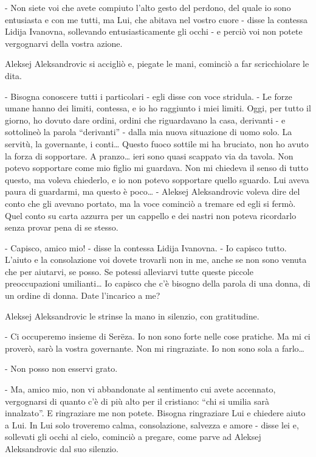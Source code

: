 - Non siete voi che avete compiuto l'alto gesto del perdono, del quale io sono entusiasta e con me tutti, ma Lui, che abitava nel vostro cuore - disse la contessa Lidija Ivanovna, sollevando entusiasticamente gli occhi - e perciò voi non potete vergognarvi della vostra azione. 

Aleksej Aleksandrovic si accigliò e, piegate le mani, cominciò a far scricchiolare le dita. 

- Bisogna conoscere tutti i particolari - egli disse con voce stridula. - Le forze umane hanno dei limiti, contessa, e io ho raggiunto i miei limiti. Oggi, per tutto il giorno, ho dovuto dare ordini, ordini che riguardavano la casa, derivanti - e sottolineò la parola ``derivanti'' - dalla mia nuova situazione di uomo solo. La servitù, la governante, i conti\ldots{} Questo fuoco sottile mi ha bruciato, non ho avuto la forza di sopportare. A pranzo\ldots{} ieri sono quasi scappato via da tavola. Non potevo sopportare come mio figlio mi guardava. Non mi chiedeva il senso di tutto questo, ma voleva chiederlo, e io non potevo sopportare quello sguardo. Lui aveva paura di guardarmi, ma questo è poco\ldots{} - Aleksej Aleksandrovic voleva dire del conto che gli avevano portato, ma la voce cominciò a tremare ed egli si fermò. Quel conto su carta azzurra per un cappello e dei nastri non poteva ricordarlo senza provar pena di se stesso. 

- Capisco, amico mio! - disse la contessa Lidija Ivanovna. - Io capisco tutto. L'aiuto e la consolazione voi dovete trovarli non in me, anche se non sono venuta che per aiutarvi, se posso. Se potessi alleviarvi tutte queste piccole preoccupazioni umilianti\ldots{} Io capisco che c'è bisogno della parola di una donna, di un ordine di donna. Date l'incarico a me? 

Aleksej Aleksandrovic le strinse la mano in silenzio, con gratitudine. 

- Ci occuperemo insieme di Serëza. Io non sono forte nelle cose pratiche. Ma mi ci proverò, sarò la vostra governante. Non mi ringraziate. Io non sono sola a farlo\ldots{} 

- Non posso non esservi grato. 

- Ma, amico mio, non vi abbandonate al sentimento cui avete accennato, vergognarsi di quanto c'è di più alto per il cristiano: ``chi si umilia sarà innalzato''. E ringraziare me non potete. Bisogna ringraziare Lui e chiedere aiuto a Lui. In Lui solo troveremo calma, consolazione, salvezza e amore - disse lei e, sollevati gli occhi al cielo, cominciò a pregare, come parve ad Aleksej Aleksandrovic dal suo silenzio. 

